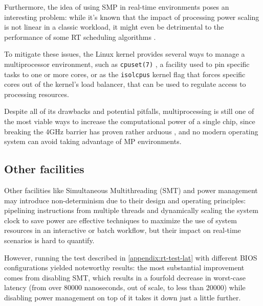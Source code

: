 \documentclass[a4paper,12pt]{report}
\newcommand{\comment}[1]{}
\begin{document}
Furthermore, the idea of using SMP in real-time environments poses an interesting problem: while it's known that the impact of processing power scaling is not linear in a classic workload, it might even be detrimental to the performance of some RT scheduling algorithms \cite[pp.~42-51]{buttazzo-hard-rt}.

\comment{ \todo{EDF sched test for MP not enough???}}

To mitigate these issues, the Linux kernel provides several ways to manage a multiprocessor environment, such as \texttt{cpuset(7)} \cite{man-cpuset-7}, a facility used to pin specific tasks to one or more cores, or as the \texttt{isolcpus} kernel flag that forces specific cores out of the kernel's load balancer, that can be used to regulate access to processing resources.

Despite all of its drawbacks and potential pitfalls, multiprocessing is still one of the most viable ways to increase the computational power of a single chip, since breaking the 4GHz barrier has proven rather arduous \cite{p4-failure}, and no modern operating system can avoid taking advantage of MP environments.

\subsection{Other facilities}

Other facilities like Simultaneous Multithreading (SMT) and power management may introduce non-determinism due to their design and operating principles: pipelining instructions from multiple threads and dynamically scaling the system clock to save power are effective techniques to maximize the use of system resources in an interactive or batch workflow, but their impact on real-time scenarios is hard to quantify.

However, running the test described in \autoref{appendix:rt-test-lat} with different BIOS configurations yielded noteworthy results: the most substantial improvement comes from disabling SMT, which results in a fourfold decrease in worst-case latency (from over 80000 nanoseconds, out of scale, to less than 20000) while disabling power management on top of it takes it down just a little further.
\end{document}
